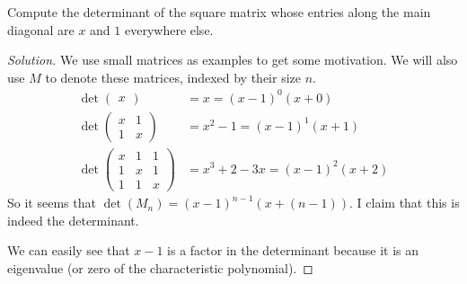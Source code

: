 \begin{prb}
Compute the determinant of the square matrix whose entries along the
main diagonal are $x$ and $1$ everywhere else.
\end{prb}

\begin{proof}[Solution]
We use small matrices as examples to get some motivation. We will also
use $M$ to denote these matrices, indexed by their size $n$.
\[ \begin{aligned}
\det\begin{pmatrix} x \end{pmatrix} &= x = (x - 1)^0 (x + 0) \\
\det\begin{pmatrix} x & 1 \\ 1 & x \end{pmatrix} &= x^2 - 1 = (x -
1)^1(x + 1) \\
\det\begin{pmatrix} x & 1 & 1 \\ 1 & x & 1 \\ 1 & 1 & x \end{pmatrix} &=
x^3 + 2 - 3x = (x - 1)^2 (x + 2)
\end{aligned} \]
So it seems that $\det(M_n) = (x - 1)^{n - 1} (x + (n - 1))$. I claim
that this is indeed the determinant.

We can easily see that $x - 1$ is a factor in the determinant because it
is an eigenvalue (or zero of the characteristic polynomial).
\end{proof}
